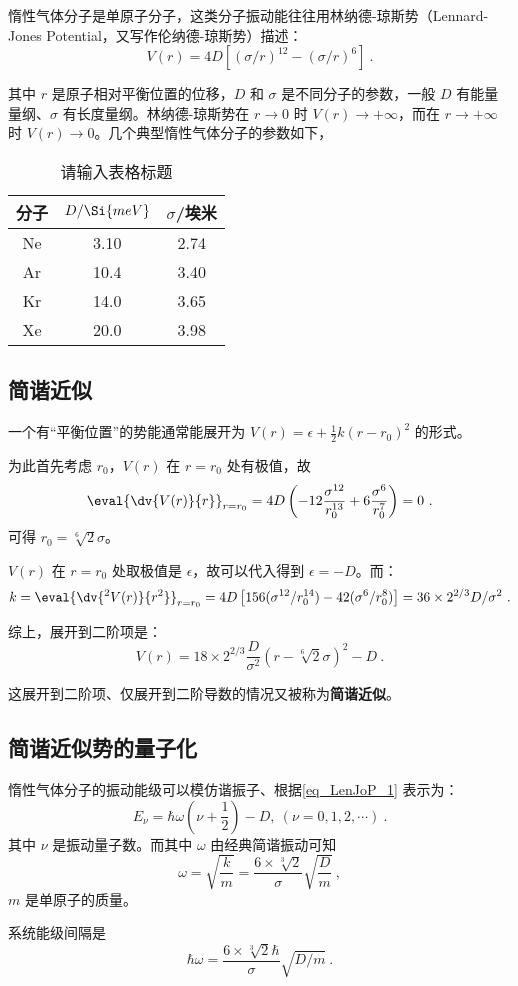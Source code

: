 
惰性气体分子是单原子分子，这类分子振动能往往用林纳德-琼斯势（Lennard-Jones Potential，又写作伦纳德-琼斯势）描述：
\begin{equation}
V(r) = 4 D\left[(\sigma / r)^{12} - (\sigma/r)^6\right] ~.
\end{equation}

其中 $r$ 是原子相对平衡位置的位移，$D$ 和 $\sigma$ 是不同分子的参数，一般 $D$ 有能量量纲、$\sigma$ 有长度量纲。林纳德-琼斯势在 $r \rightarrow 0$ 时 $V(r) \rightarrow +\infty$，而在 $r \rightarrow +\infty$ 时 $V(r) \rightarrow 0$。几个典型惰性气体分子的参数如下，
\begin{table}[ht]
\centering
\caption{请输入表格标题}\label{tab_LenJoP1}
\begin{tabular}{|c|c|c|}
\hline
分子 & $D/\Si{meV}$ & $\sigma$/埃米 \\
\hline
Ne & 3.10 & 2.74 \\
\hline
Ar & 10.4 & 3.40 \\
\hline
Kr & 14.0 & 3.65 \\
\hline
Xe & 20.0 & 3.98 \\
\hline
\end{tabular}
\end{table}


\subsection{简谐近似}
一个有“平衡位置”的势能通常能展开为 $V(r) = \epsilon + \frac{1}2 k (r-r_0)^2$ 的形式。

为此首先考虑 $r_0$，$V(r)$ 在 $r=r_0$ 处有极值，故
$$\eval{\dv{V(r)}{r}} _{r=r_0} = 4D\left(-12 \frac{\sigma^{12}}{r_0 ^{13}} + 6 \frac{\sigma^6}{r_0^7}\right) = 0~.$$
可得 $r_0 = \sqrt[6]{2} \sigma$。

$V(r)$ 在 $r=r_0$ 处取极值是 $\epsilon$，故可以代入得到 $\epsilon = -D$。而：
$$k = \eval{\dv{^2 V(r)}{r^2}}_{r=r_0} = 4 D \left[156 (\sigma^{12} / r_0^{14}) - 42 (\sigma^{6}/r_0^{8})\right] = 36 \times 2^{2/3} D/\sigma^2 ~.$$

综上，展开到二阶项是：
\begin{equation}\label{eq_LenJoP_1}
V(r) = 18 \times 2^{2/3} \frac{D}{\sigma^2} (r - \sqrt[6]{2} \sigma)^2 - D ~.
\end{equation}

这展开到二阶项、仅展开到二阶导数的情况又被称为\textbf{简谐近似}。
\subsection{简谐近似势的量子化}\label{sub_LenJoP_1}
惰性气体分子的振动能级可以模仿谐振子、根据\autoref{eq_LenJoP_1} 表示为：
\begin{equation}
E_\nu = \hbar \omega \left(\nu + \frac12\right) - D,  \ (\nu = 0, 1, 2, \cdots) ~.
\end{equation}
其中 $\nu$ 是振动量子数。而其中 $\omega$ 由经典简谐振动可知
\begin{equation}
\omega = \sqrt{\frac km} = \frac{6 \times \sqrt[3]{2}}{\sigma}\sqrt{\frac Dm} ~,
\end{equation} 
$m$ 是单原子的质量。

系统能级间隔是
\begin{equation}
\hbar \omega = \frac{6\times\sqrt[3]2 \hbar}{\sigma} \sqrt{D/m} ~.
\end{equation}
